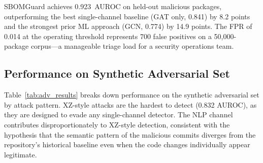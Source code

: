 \documentclass[sigconf,nonacm]{acmart}
\begin{document}
\begin{table}[h]
\caption{Detection performance on held-out malicious packages and synthetic adversarial set.}
\label{tab:main_results}
\end{table}

SBOMGuard achieves 0.923~AUROC on held-out malicious packages, outperforming the
best single-channel baseline (GAT only, 0.841) by 8.2 points and the strongest
prior ML approach (GCN, 0.774) by 14.9 points. The FPR of 0.014 at the operating
threshold represents 700 false positives on a 50,000-package corpus---a manageable
triage load for a security operations team.

\subsection{Performance on Synthetic Adversarial Set}

Table~\ref{tab:adv_results} breaks down performance on the synthetic adversarial set
by attack pattern. XZ-style attacks are the hardest to detect (0.832 AUROC), as they
are designed to evade any single-channel detector. The NLP channel contributes
disproportionately to XZ-style detection, consistent with the hypothesis that the
semantic pattern of the malicious commits diverges from the repository's historical
baseline even when the code changes individually appear legitimate.
\end{document}
